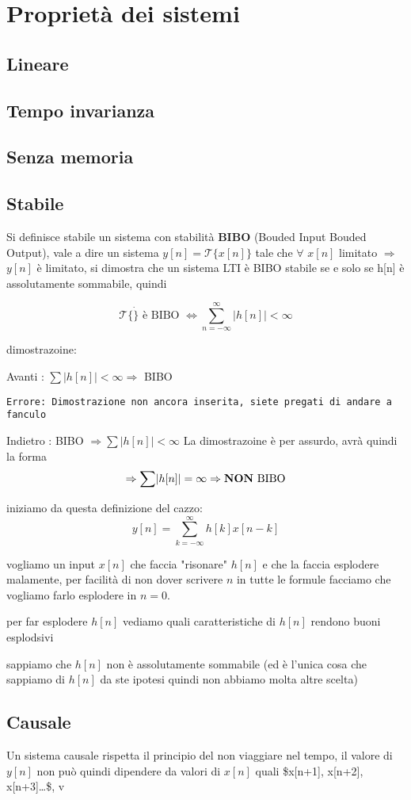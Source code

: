 \documentclass[11pt]{article}
\date{\today}
\title{}
\begin{document}
\tableofcontents


\section{Proprietà dei sistemi}
\label{sec:orge8038e5}
\subsection{Lineare}
\label{sec:org6bcf15d}
\subsection{Tempo invarianza}
\label{sec:org7811ddb}
\subsection{Senza memoria}
\label{sec:org9483087}
\subsection{Stabile}
\label{sec:orgeb76735}
Si definisce stabile un sistema con stabilità \textbf{BIBO} (Bouded Input
Bouded Output), vale a dire un sistema \(y[n] = \mathcal{T}\{x[n]\}\)
tale che \(\forall\) \(x[n]\) limitato \(\Rightarrow\) \(y[n]\) è limitato, si
dimostra che un sistema LTI è BIBO stabile se e solo se h[n] è
assolutamente sommabile, quindi 

\[
\mathcal{T}\{\dot\} \text{ è BIBO } \iff
\sum_{n=-\infty}^{\infty} \lvert h[n] \rvert < \infty
\]

dimostrazoine:

Avanti : \(\sum \lvert h[n] \rvert < \infty \Rightarrow\) BIBO
\begin{verbatim}
Errore: Dimostrazione non ancora inserita, siete pregati di andare a fanculo
\end{verbatim}

Indietro : BIBO \(\Rightarrow \sum \lvert h[n] \rvert < \infty\)
La dimostrazoine è per assurdo, avrà quindi la forma
\[
\Rightarrow \sum \lvert h[n] \rvert = \infty \Rightarrow
\text{\textbf{NON} BIBO}
\]

iniziamo da questa definizione del cazzo:
\[
y[n] = \sum_{k=-\infty}^{\infty} h[k] x[n-k]
\]

vogliamo un input \(x[n]\) che faccia "risonare" \(h[n]\) e che la faccia
esplodere malamente, per facilità di non dover scrivere \(n\) in tutte
le formule facciamo che vogliamo farlo esplodere in \(n=0\).

per far esplodere \(h[n]\) vediamo quali caratteristiche di \(h[n]\)
rendono buoni esplodsivi

sappiamo che \(h[n]\) non è assolutamente sommabile (ed è l'unica cosa
che sappiamo di \(h[n]\) da ste ipotesi quindi non abbiamo molta altre
scelta)

\subsection{Causale}
\label{sec:orge635064}

Un sistema causale rispetta il principio del non viaggiare nel tempo,
il valore di \(y[n]\) non può quindi dipendere da valori di \(x[n]\) quali
\$x[n+1], x[n+2], x[n+3]\ldots{}\$, v
\end{document}
